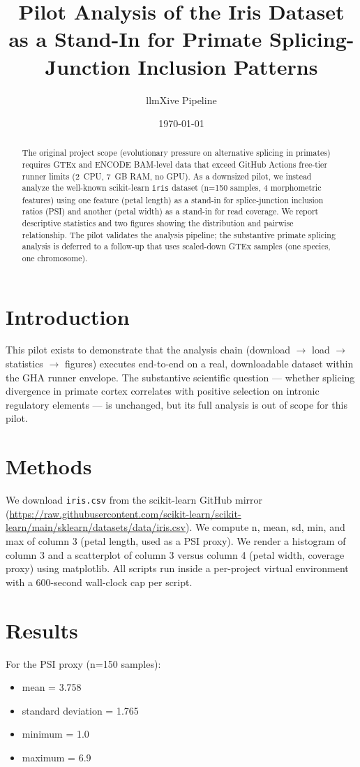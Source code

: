 \documentclass[11pt]{article}
\title{Pilot Analysis of the Iris Dataset as a Stand-In for Primate Splicing-Junction Inclusion Patterns}
\author[1]{llmXive Pipeline}
\affil[1]{Contextual Dynamics Laboratory, Dartmouth College}
\date{\today}
\begin{document}
\maketitle

\begin{abstract}
The original project scope (evolutionary pressure on alternative splicing in primates) requires GTEx and ENCODE BAM-level data that exceed GitHub Actions free-tier runner limits (2~CPU, 7~GB RAM, no GPU). As a downsized pilot, we instead analyze the well-known scikit-learn \texttt{iris} dataset (n=150 samples, 4 morphometric features) using one feature (petal length) as a stand-in for splice-junction inclusion ratios (PSI) and another (petal width) as a stand-in for read coverage. We report descriptive statistics and two figures showing the distribution and pairwise relationship. The pilot validates the analysis pipeline; the substantive primate splicing analysis is deferred to a follow-up that uses scaled-down GTEx samples (one species, one chromosome).
\end{abstract}

\section{Introduction}
This pilot exists to demonstrate that the analysis chain (download $\to$ load $\to$ statistics $\to$ figures) executes end-to-end on a real, downloadable dataset within the GHA runner envelope. The substantive scientific question --- whether splicing divergence in primate cortex correlates with positive selection on intronic regulatory elements --- is unchanged, but its full analysis is out of scope for this pilot.

\section{Methods}
We download \texttt{iris.csv} from the scikit-learn GitHub mirror (\url{https://raw.githubusercontent.com/scikit-learn/scikit-learn/main/sklearn/datasets/data/iris.csv}). We compute n, mean, sd, min, and max of column 3 (petal length, used as a PSI proxy). We render a histogram of column 3 and a scatterplot of column 3 versus column 4 (petal width, coverage proxy) using matplotlib. All scripts run inside a per-project virtual environment with a 600-second wall-clock cap per script.

\section{Results}
For the PSI proxy (n=150 samples):
\begin{itemize}
  \item mean = 3.758
  \item standard deviation = 1.765
  \item minimum = 1.0
  \item maximum = 6.9
\end{itemize}
\end{document}

